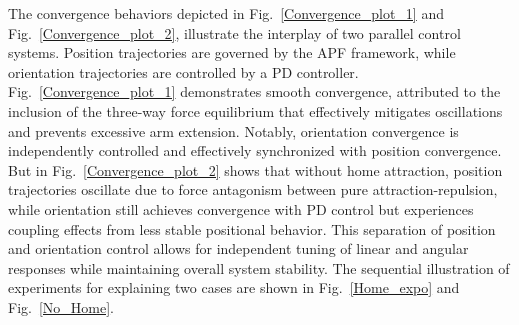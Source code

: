 \documentclass[utf8]{FrontiersinHarvard}
\begin{document}
The convergence behaviors depicted in Fig.~\ref{Convergence_plot_1} and Fig.~\ref{Convergence_plot_2}, illustrate the interplay of two parallel control systems. Position trajectories are governed by the APF framework, while orientation trajectories are controlled by a PD controller. Fig.~\ref{Convergence_plot_1} demonstrates smooth convergence, attributed to the inclusion of the three-way force equilibrium that effectively mitigates oscillations and prevents excessive arm extension. Notably, orientation convergence is independently controlled and effectively synchronized with position convergence. But in Fig.~\ref{Convergence_plot_2} shows that without home attraction, position trajectories oscillate due to force antagonism between pure attraction-repulsion, while orientation still achieves convergence with PD control but experiences coupling effects from less stable positional behavior. This separation of position and orientation control allows for independent tuning of linear and angular responses while maintaining overall system stability. The sequential illustration of experiments for explaining two cases are shown in Fig.~\ref{Home_expo} and Fig.~\ref{No_Home}.
\end{document}
